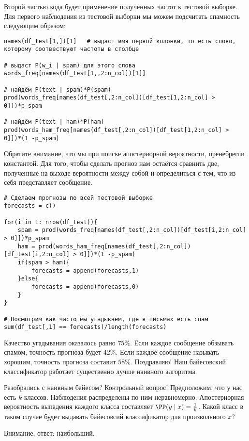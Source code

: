 \begin{problem}
\begin{sol}
Второй частью кода будет применение полученных частот к тестовой выборке.  Для первого наблюдения из тестовой выборки мы можем подсчитать спамность следующим образом: 


\begin{verbatim}
names(df_test[1,])[1]   # выдаст имя первой колонки, то есть слово,  которому соотвествуют частоты в столбце

# выдаст P(w_i | spam) для этого слова 
words_freq[names(df_test[1,,2:n_col])[1]]  

# найдём P(text | spam)*P(spam)
prod(words_freq[names(df_test[,2:n_col])[df_test[1,2:n_col] > 0]])*p_spam

# найдём P(text | ham)*P(ham)
prod(words_ham_freq[names(df_test[,2:n_col])[df_test[1,2:n_col] > 0]])*(1 -p_spam)
\end{verbatim}

Обратите внимание, что мы при поиске апостериорной вероятности, пренебрегли константой.  Для того, чтобы сделать прогноз нам остаётся сравнить две, полученные на выходе вероятности между собой и определиться с тем, что из себя представляет сообщение. 

\begin{verbatim}
# Сделаем прогнозы по всей тестовой выборке
forecasts = c()

for(i in 1: nrow(df_test)){
    spam = prod(words_freq[names(df_test[,2:n_col])[df_test[i,2:n_col] > 0]])*p_spam
    ham = prod(words_ham_freq[names(df_test[,2:n_col])[df_test[i,2:n_col] > 0]])*(1 -p_spam)
    if(spam > ham){
        forecasts = append(forecasts,1)
    }else{
        forecasts = append(forecasts,0)
    }
}

# Посмотрим как часто мы угадываем, где в письмах есть спам
sum(df_test[,1] == forecasts)/length(forecasts)
\end{verbatim}

Качество угадывания оказалось равно $75\%$. Если каждое сообщение обзывать спамом, точность прогноза будет $42\%$. Если каждое сообщение называть хорошим, точность прогноза составит $58\%$. Поздравляю! Наш байесовский классификатор работает существенно лучше наивного алгоритма. 

Разобрались с наивным байесом? Контрольный вопрос! Предположим, что у нас есть $k$ классов. Наблюдения распределены по ним неравномерно.  Апостериорная вероятность выпадения каждого класса составляет $\PP(y \mid x) = \frac{1}{k}$.  Какой класс в таком случае будет выдавать байесовсий классификатор для произвольного $x$? 

Внимание, ответ: наибольший. 
\end{sol} 
\end{problem} 

